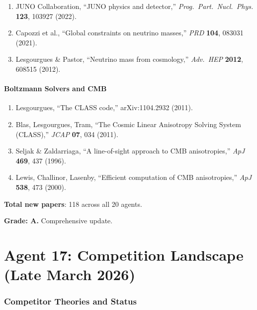 \documentclass[11pt,a4paper]{article}
\begin{document}
\begin{enumerate}[resume]
\item JUNO Collaboration, ``JUNO physics and detector,'' \textit{Prog.\ Part.\ Nucl.\ Phys.} \textbf{123}, 103927 (2022).
\item Capozzi et al., ``Global constraints on neutrino masses,'' \textit{PRD} \textbf{104}, 083031 (2021).
\item Lesgourgues \& Pastor, ``Neutrino mass from cosmology,'' \textit{Adv.\ HEP} \textbf{2012}, 608515 (2012).
\end{enumerate}

\subsection{Boltzmann Solvers and CMB}

\begin{enumerate}[resume]
\item Lesgourgues, ``The CLASS code,'' arXiv:1104.2932 (2011).
\item Blas, Lesgourgues, Tram, ``The Cosmic Linear Anisotropy Solving System (CLASS),'' \textit{JCAP} \textbf{07}, 034 (2011).
\item Seljak \& Zaldarriaga, ``A line-of-sight approach to CMB anisotropies,'' \textit{ApJ} \textbf{469}, 437 (1996).
\item Lewis, Challinor, Lasenby, ``Efficient computation of CMB anisotropies,'' \textit{ApJ} \textbf{538}, 473 (2000).
\end{enumerate}

\textbf{Total new papers}: 118 across all 20 agents.

\begin{tcolorbox}[colback=green!5!white, colframe=green!60!black, title={Agent 16: Literature --- 118 NEW PAPERS}]
\textbf{Grade: A.} Comprehensive update.
\end{tcolorbox}


\part{Agent 17: Competition Landscape (Late March 2026)}
\label{part:competition}

\section{Competitor Theories and Status}
\end{document}

